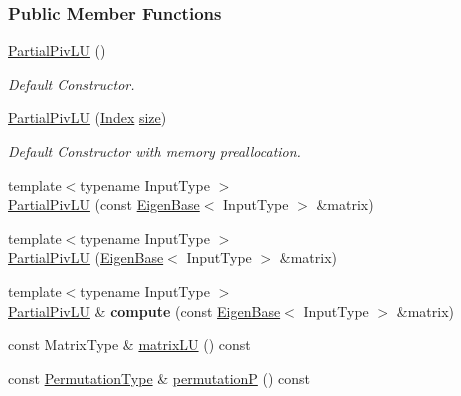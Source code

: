 \subsubsection*{Public Member Functions}
\begin{DoxyCompactItemize}
\item 
\hyperlink{group___l_u___module_a5c04818d354f94a98786d8a44cb709c6}{Partial\+Piv\+LU} ()
\begin{DoxyCompactList}\small\item\em Default Constructor. \end{DoxyCompactList}\item 
\hyperlink{group___l_u___module_acf892c12d8a229b32bddc3149e32e63a}{Partial\+Piv\+LU} (\hyperlink{group___core___module_a554f30542cc2316add4b1ea0a492ff02}{Index} \hyperlink{group___core___module_ac2c9348df3bb9c0044dbae6c278a8977}{size})
\begin{DoxyCompactList}\small\item\em Default Constructor with memory preallocation. \end{DoxyCompactList}\item 
{\footnotesize template$<$typename Input\+Type $>$ }\\\hyperlink{group___l_u___module_acf37214aebb54d0e186ae39ac6c41bdf}{Partial\+Piv\+LU} (const \hyperlink{group___core___module_struct_eigen_1_1_eigen_base}{Eigen\+Base}$<$ Input\+Type $>$ \&matrix)
\item 
{\footnotesize template$<$typename Input\+Type $>$ }\\\hyperlink{group___l_u___module_a4efc917d31d0e9d76781a97509309061}{Partial\+Piv\+LU} (\hyperlink{group___core___module_struct_eigen_1_1_eigen_base}{Eigen\+Base}$<$ Input\+Type $>$ \&matrix)
\item 
\mbox{\label{group___l_u___module_a6236eb61ae6886543c407582f4ca1550}} 
{\footnotesize template$<$typename Input\+Type $>$ }\\\hyperlink{group___l_u___module_class_eigen_1_1_partial_piv_l_u}{Partial\+Piv\+LU} \& {\bfseries compute} (const \hyperlink{group___core___module_struct_eigen_1_1_eigen_base}{Eigen\+Base}$<$ Input\+Type $>$ \&matrix)
\item 
const Matrix\+Type \& \hyperlink{group___l_u___module_abea0d7e51c5591a6db152eade0892d9c}{matrix\+LU} () const
\item 
const \hyperlink{group___core___module}{Permutation\+Type} \& \hyperlink{group___l_u___module_a1c637530b3215787668a75ebb2e7b882}{permutationP} () const

\end{DoxyCompactItemize}
